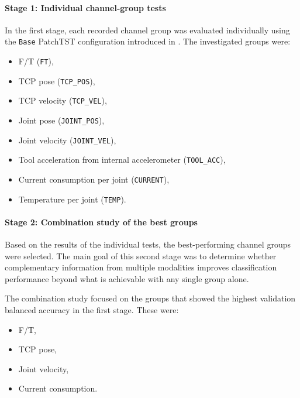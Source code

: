 \paragraph{Stage 1: Individual channel-group tests}
In the first stage, each recorded channel group was evaluated individually using the \texttt{Base} PatchTST configuration introduced in . The investigated groups were:
\begin{itemize}
    \item F/T (\texttt{FT}),
    \item TCP pose (\texttt{TCP\_POS}),
    \item TCP velocity (\texttt{TCP\_VEL}),
    \item Joint pose (\texttt{JOINT\_POS}),
    \item Joint velocity (\texttt{JOINT\_VEL}),
    \item Tool acceleration from internal accelerometer (\texttt{TOOL\_ACC}),
    \item Current consumption per joint (\texttt{CURRENT}),
    \item Temperature per joint (\texttt{TEMP}).
\end{itemize}


\paragraph{Stage 2: Combination study of the best groups}

Based on the results of the individual tests, the best-performing channel groups were selected. The main goal of this second stage was to determine whether complementary information from multiple modalities improves classification performance beyond what is achievable with any single group alone.

The combination study focused on the groups that showed the highest validation balanced accuracy in the first stage. These were:
\begin{itemize}
    \item F/T,
    \item TCP pose,
    \item Joint velocity,
    \item Current consumption.
\end{itemize}

